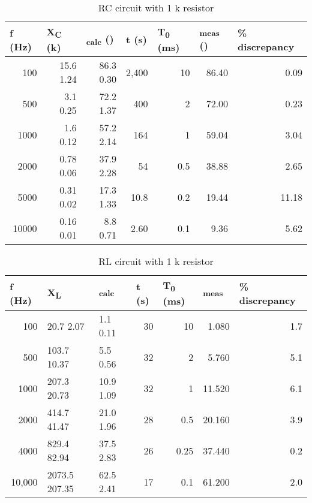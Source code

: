 \documentclass{article}
\begin{document}
			\begin{table}[h]
				\centering
				\caption{RC circuit with 1 k\textOmega{} resistor}
				\label{tab:2}
				\begin{tabular}{@{}rrrrrrr@{}}
				\toprule
				\multicolumn{1}{l}{f (Hz)} &
				\multicolumn{1}{l}{X\textsubscript{C} (k\textOmega{})} &
				\multicolumn{1}{l}{\straightphi\textsubscript{calc} (\textdegree)} &
				\multicolumn{1}{l}{\textDelta{}t (\textmu{}s)} &
				\multicolumn{1}{l}{T\textsubscript{0} (ms)} &
				\multicolumn{1}{l}{\straightphi\textsubscript{meas} (\textdegree)} &
				\multicolumn{1}{l}{\% discrepancy \straightphi} \\ \midrule
				100   & 15.6 \textpm{} 1.24 & 86.3 \textpm{} 0.30 & 2,400 & 10   & 86.40 & 0.09  \\
				500   & 3.1 \textpm{} 0.25 & 72.2 \textpm{} 1.37 & 400 & 2  & 72.00 & 0.23  \\
				1000  & 1.6 \textpm{} 0.12 & 57.2 \textpm{} 2.14 & 164 & 1  & 59.04 & 3.04  \\
				2000  & 0.78 \textpm{} 0.06 & 37.9 \textpm{} 2.28 & 54 & 0.5 & 38.88 & 2.65  \\
				5000  & 0.31 \textpm{} 0.02 & 17.3 \textpm{} 1.33 & 10.8 & 0.2 & 19.44 & 11.18 \\
				10000 & 0.16 \textpm{} 0.01 & 8.8 \textpm{} 0.71  & 2.60 & 0.1 & 9.36  & 5.62  \\ \bottomrule
				\end{tabular}
			\end{table}

\begin{table}[h]
	\centering
	\caption{RL circuit with 1 k resistor}
	\label{tab:3}
	\begin{tabular}{@{}rllrrrr@{}}
	\toprule
	\multicolumn{1}{l}{f (Hz)} &
	  X\textsubscript{L} &
	  \straightphi\textsubscript{calc} &
	  \multicolumn{1}{l}{\textDelta{}t (\textmu{}s)} &
	  \multicolumn{1}{l}{T\textsubscript{0} (ms)} &
	  \multicolumn{1}{l}{\straightphi\textsubscript{meas}} &
	  \multicolumn{1}{l}{\% discrepancy \straightphi} \\ \midrule
	100    & 20.7 \textpm{} 2.07     & 1.1 \textpm{} 0.11  & 30 & 10    & 1.080  & 1.7 \\
	500    & 103.7 \textpm{} 10.37   & 5.5 \textpm{} 0.56  & 32 & 2   & 5.760  & 5.1 \\
	1000   & 207.3 \textpm{} 20.73   & 10.9 \textpm{} 1.09 & 32 & 1   & 11.520 & 6.1 \\
	2000   & 414.7 \textpm{} 41.47   & 21.0 \textpm{} 1.96 & 28 & 0.5  & 20.160 & 3.9 \\
	4000   & 829.4 \textpm{} 82.94   & 37.5 \textpm{} 2.83 & 26 & 0.25 & 37.440 & 0.2 \\
	10,000 & 2073.5 \textpm{} 207.35 & 62.5 \textpm{} 2.41 & 17 & 0.1  & 61.200 & 2.0 \\ \bottomrule
	\end{tabular}
	\end{table}
\end{document}
